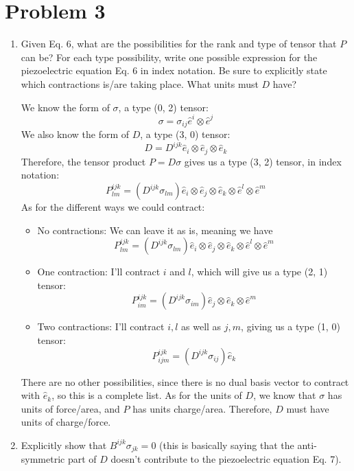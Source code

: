 \documentclass[10pt]{article}
\begin{document}
	\section*{Problem 3}
	\begin{enumerate}[label=\alph*)]
		\item Given Eq. 6, what are the possibilities for the rank and type of tensor that $P$ can be? For each type 
	possibility, write one possible expression for the piezoelectric equation Eq. 6 in index notation. 
	Be sure to explicitly state which contractions is/are taking place. What units must $D$ have?

	\begin{solution}
		We know the form of $\sigma$, a type (0, 2) tensor: 
		\[
			\sigma = \sigma_{ij} \hat{e}^i \otimes \hat{e}^j
		\] 
		We also know the form of $D$, a type (3, 0) tensor:
		\[
			D = D^{ijk} \hat{e}_i \otimes \hat{e}_j \otimes \hat{e}_k
		\] 
		Therefore, the tensor product $P = D \sigma$ gives us a type (3, 2) tensor, in index notation:
		\[
			P^{ijk}_{lm} = (D^{ijk} \sigma_{lm}) \hat{e}_i \otimes \hat{e}_j \otimes \hat{e}_k \otimes \hat{e}^l 
			\otimes \hat{e}^m
		\] 
		As for the different ways 
		we could contract:
		\begin{itemize}
			\item No contractions: We can leave it as is, meaning we have 
				\[
					P^{ijk}_{lm} = (D^{ijk} \sigma_{lm}) \hat{e}_i \otimes \hat{e}_j \otimes \hat{e}_k \otimes 
					\hat{e}^l \otimes \hat{e}^m
				\] 
			\item One contraction: I'll contract $i$ and $l$, which will give us a type (2, 1) tensor:
				\[
					P^{ijk}_{im} = (D^{ijk}\sigma_{im}) \hat{e}_j \otimes \hat{e}_k \otimes \hat{e}^m
				\] 
			\item Two contractions: I'll contract $i, l$ as well as $j, m$, giving us a type (1, 0) tensor:
				\[
					P^{ijk}_{ijm} = (D^{ijk} \sigma_{ij}) \hat{e}_k
				\] 
		\end{itemize}
		There are no other possibilities, since there is no dual basis vector to contract with $\hat{e}_k$, so 
		this is a complete list. As for the units of $D$, we know that $\sigma$ has units of force/area, 
		and $P$ has units charge/area. Therefore, $D$ must have units of charge/force.
	\end{solution}
\item Explicitly show that $B^{ijk} \sigma_{jk} = 0$ (this is basically saying that the anti-symmetric part of 
	$D$ doesn't contribute to the piezoelectric equation Eq. 7). 


\end{enumerate}
\end{document}
